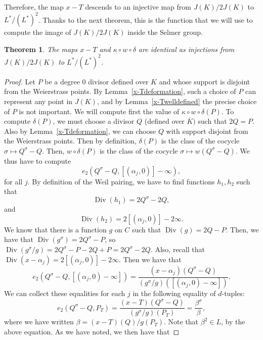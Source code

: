 \documentclass[a4paper, 12pt]{amsart}
\theoremstyle{definition}
\theoremstyle{plain}
\theoremstyle{plain}
\newtheorem{thm0}[defn0]{Theorem}
\theoremstyle{plain}
\theoremstyle{plain}
\theoremstyle{remark}
\theoremstyle{remark}
\theoremstyle{plain}
\newenvironment{theorem}{ \begin{thm0}}{\end{thm0}}
\newcommand{\lemref}[1]{Lemma~\ref{#1}}
\DeclareMathOperator{\Div}{Div}
\begin{document}
	Therefore, the map $x-T$ descends to an injective map from $J(K)/2J(K)$ to $L^*/(L^*)^2$. Thanks to the next theorem, this is the function that we will use to compute the image of $J(K)/2J(K)$ inside the Selmer group.
	\begin{theorem}\label{x-Tinjection}
		The maps $x-T$ and $\kappa\circ w\circ \delta$ are identical as injections from $J(K)/2J(K)$ to $L^*/(L^*)^2$.
	\end{theorem}
	\begin{proof}
		Let $P$ be a degree 0 divisor defined over $K$ and whose support is disjoint from the Weierstrass points. By \lemref{x-Tdeformation}, such a choice of $P$ can represent any point in $J(K)$, and by \lemref{x-Twelldefined} the precise choice of $P$ is not important. We will compute first the value of $\kappa\circ w\circ \delta(P)$. To compute $\delta(P)$, we must choose a divisor $Q$ (defined over $\overline{K})$ such that $2Q=P$. Also by \lemref{x-Tdeformation}, we can choose $Q$ with support disjoint from the Weierstrass points. Then by definition, $\delta(P)$ is the class of the cocycle $\sigma\mapsto Q^\sigma-Q$. Then, $w\circ\delta(P)$ is the class of the cocycle $\sigma\mapsto w(Q^\sigma-Q)$. We thus have to compute
		\begin{equation*}
			e_2(Q^\sigma-Q,[(\alpha_j,0)]-\infty),
		\end{equation*}
		for all $j$. By definition of the Weil pairing, we have to find functions $h_1,h_2$ such that
		\begin{equation*}
			\Div(h_1)=2Q^\sigma-2Q,
		\end{equation*}
		and
		\begin{equation*}
			\Div(h_2)=2[(\alpha_j,0)]-2\infty.
		\end{equation*}
		We know that there is a function $g$ on $C$ such that $\Div(g)=2Q-P$. Then, we have that $\Div(g^\sigma)=2Q^\sigma-P$, so $\Div(g^\sigma/g)=2Q^\sigma-P-2Q+P=2Q^\sigma-2Q$. Also, recall that $\Div(x-\alpha_j)=2[(\alpha_j,0)]-2\infty$. Then we have that
		\begin{equation*}
			e_2(Q^\sigma-Q,[(\alpha_j,0)-\infty])=\frac{(x-\alpha_j)(Q^\sigma-Q)}{(g^\sigma/g)([(\alpha_j,0)-\infty])}.
		\end{equation*}
		We can collect these equalities for each $j$ in the following equality of $d$-tuples:
		\begin{equation}
			e_2(Q^\sigma-Q,P_T)=\frac{(x-T)(Q^\sigma-Q)}{(g^\sigma/g)(P_T)}=\frac{\beta^\sigma}{\beta},
		\end{equation}
		where we have written $\beta=(x-T)(Q)/g(P_T)$. Note that $\beta^2\in L$, by the above equation. As we have noted, we then have that

\end{proof}
\end{document}
